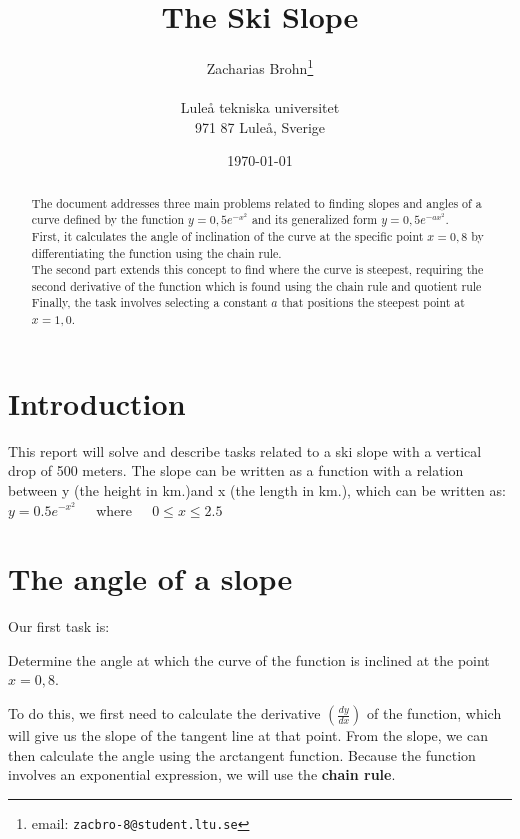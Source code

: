 \documentclass[a4paper,12pt]{article}
\title{The Ski Slope}
\author{Zacharias Brohn\thanks{email:
    \texttt{zacbro-8@student.ltu.se}}\\  
    ~ \\
    Luleå tekniska universitet \\ 
    971 87 Luleå, Sverige}
\date{\today}
\begin{document}
\linenumbers %

\maketitle

\begin{abstract}
    The document addresses three main problems related to finding slopes and 
    angles of a curve defined by the function $y = 0,5e^{-x^2}$ and its 
    generalized form $y = 0,5e^{-ax^2}$. \\
  
    First, it calculates the angle of inclination of the curve at the specific 
    point $x = 0,8$ by differentiating the function using the chain rule. \\

    The second part extends this concept to find where the curve is steepest, 
    requiring the second derivative of the function which is found using the 
    chain rule and quotient rule \\

    Finally, the task involves selecting a constant $a$ that positions the 
    steepest point at $x = 1,0$.
\end{abstract}
%
\section{Introduction}
\label{sec:introduktion}
This report will solve and describe tasks related to a ski slope with a vertical
drop of 500 meters. The slope can be written as a function with a relation 
between y (the height in km.)and x (the length in km.),
which can be written as:\\ %
$y = 0.5e^{-x^2}$ $\>$ $\>$ where $\>$ $\>$ $0 \leq x \leq 2.5$
%
\newpage
\section{The angle of a slope}
\label{sec:uppg1}
Our first task is:\\ %
\begin{addmargin}[1em]{1em}
    Determine the angle at which the curve of the function is inclined at the %
    point $x=0,8$.\\ %
\end{addmargin}
To do this, we first need to calculate the derivative 
$\left(\frac{dy}{dx}\right)$ of the function, which will give us the slope of 
the tangent line at that point. From the slope, we can then calculate the 
angle using the arctangent function. Because the function involves an 
exponential expression, we will use the \textbf{chain rule}.
%
\end{document}
